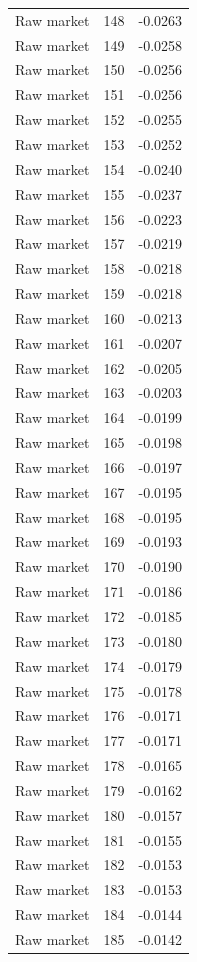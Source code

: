 \begin{table}[htbp]
\begin{tabular}{lll}
Raw market & 148 & -0.0263 \\
Raw market & 149 & -0.0258 \\
Raw market & 150 & -0.0256 \\
Raw market & 151 & -0.0256 \\
Raw market & 152 & -0.0255 \\
Raw market & 153 & -0.0252 \\
Raw market & 154 & -0.0240 \\
Raw market & 155 & -0.0237 \\
Raw market & 156 & -0.0223 \\
Raw market & 157 & -0.0219 \\
Raw market & 158 & -0.0218 \\
Raw market & 159 & -0.0218 \\
Raw market & 160 & -0.0213 \\
Raw market & 161 & -0.0207 \\
Raw market & 162 & -0.0205 \\
Raw market & 163 & -0.0203 \\
Raw market & 164 & -0.0199 \\
Raw market & 165 & -0.0198 \\
Raw market & 166 & -0.0197 \\
Raw market & 167 & -0.0195 \\
Raw market & 168 & -0.0195 \\
Raw market & 169 & -0.0193 \\
Raw market & 170 & -0.0190 \\
Raw market & 171 & -0.0186 \\
Raw market & 172 & -0.0185 \\
Raw market & 173 & -0.0180 \\
Raw market & 174 & -0.0179 \\
Raw market & 175 & -0.0178 \\
Raw market & 176 & -0.0171 \\
Raw market & 177 & -0.0171 \\
Raw market & 178 & -0.0165 \\
Raw market & 179 & -0.0162 \\
Raw market & 180 & -0.0157 \\
Raw market & 181 & -0.0155 \\
Raw market & 182 & -0.0153 \\
Raw market & 183 & -0.0153 \\
Raw market & 184 & -0.0144 \\
Raw market & 185 & -0.0142 \\

\end{tabular}
\end{table}

